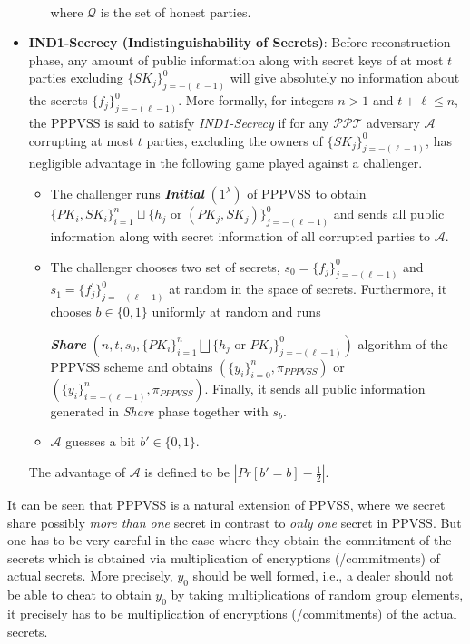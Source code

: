 \begin{itemize}
\begin{itemize}
\begin{align*}
        \end{align*}
        where $\mathcal{Q}$ is the set of honest parties.
    \end{itemize}
  \item \textbf{IND1-Secrecy (Indistinguishability of Secrets)}: Before reconstruction phase, any amount of public 
    information along with secret keys of at most $t$ parties excluding $\{SK_j\}_{j=-(\ell-1)}^0$ will give 
    absolutely no information about the secrets $\{f_j\}_{j=-(\ell-1)}^0$. More formally, for integers $n>1$ and 
    $t+\ell\leq n$, the PPPVSS is said to satisfy \textit{IND1-Secrecy} if for any $\mathcal{PPT}$ adversary $\mathcal{A}$ 
    corrupting at most $t$ parties, excluding the owners of $\{SK_j\}_{j=-(\ell-1)}^0$, has negligible 
    advantage in the following game \cite{cryptoeprint:2025/576} played against a challenger.
    \begin{itemize}
      \item The challenger runs \textit{\textbf{Initial}} $(1^\lambda)$ of PPPVSS to obtain 
        $\{PK_i,SK_i\}_{i=1}^n\sqcup\{h_j\text{ or }(PK_j,SK_j)\}_{j=-(\ell-1)}^0$ and sends all public 
        information along with secret information of all corrupted parties to $\mathcal{A}$.
      \item The challenger chooses two set of secrets, $s_0=\{f_j\}_{j=-(\ell-1)}^0$ and 
        $s_1=\{f_j^{'}\}_{j=-(\ell-1)}^0$ at random in the space of secrets. Furthermore, it chooses $b\in\{0,1\}$ 
        uniformly at random and runs \par 
        \textit{\textbf{Share}} $(n,t,s_0,\{PK_i\}_{i=1}^n\bigsqcup\{h_j\text{ or }PK_j\}_{j=-(\ell-1)}^0)$ 
        algorithm of the PPPVSS scheme and obtains $(\{y_i\}_{i=0}^n,\pi_{PPPVSS})$ or 
        $(\{y_i\}_{i=-(\ell-1)}^n,\pi_{PPPVSS})$. Finally, it sends all public information generated in 
        \textit{Share} phase together with $s_b$.
      \item $\mathcal{A}$ guesses a bit $b'\in\{0,1\}$.
    \end{itemize}
    The advantage of $\mathcal{A}$ is defined to be $|Pr[b'=b]-\frac{1}{2}|$.
\end{itemize}

It can be seen that PPPVSS is a natural extension of PPVSS, where we secret share possibly \textit{more than one} 
secret in contrast to \textit{only one} secret in PPVSS. But one has to be very careful in the case where they 
obtain the commitment of the secrets which is obtained via multiplication of encryptions (/commitments) of 
actual secrets. More precisely, $y_0$ should be well formed, i.e., a dealer should not be able to cheat to 
obtain $y_0$ by taking multiplications of random group elements, it precisely has to be multiplication of 
encryptions (/commitments) of the actual secrets.\par 

